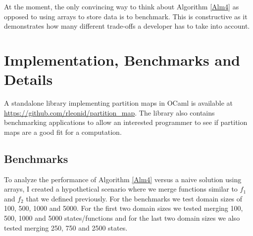 \documentclass{article}
\begin{document}
At the moment, the only convincing way to think about Algorithm \ref{Alm4} as
opposed to using arrays to store data is to benchmark.
This is constructive as it demonstrates how many different trade-offs a
developer has to take into account.


\section{Implementation, Benchmarks and Details}

A standalone library implementing partition maps in OCaml\cite{ocaml-manual}
is available at \url{https://github.com/rleonid/partition_map}.
The library also contains benchmarking applications to allow an interested
programmer to see if partition maps are a good fit for a computation.

\subsection{Benchmarks}

To analyze the performance of Algorithm \ref{Alm4} versus a naive solution
using arrays,
I created a hypothetical scenario where we merge functions
similar to $f_{1}$ and $f_{2}$ that we defined previously.
For the benchmarks we test domain sizes of 100, 500, 1000 and 5000.
For the first two domain sizes we tested merging 100, 500, 1000 and 5000
states/functions and for the last two domain sizes we also tested merging
250, 750 and 2500 states.
\end{document}
